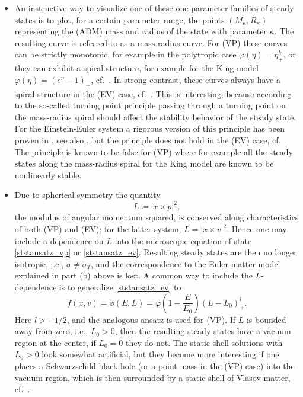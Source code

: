 \documentclass[11pt]{article}
\begin{document}
\begin{remark}
\begin{itemize}
    effect on the stability
    properties of the corresponding steady states, but in the (EV) case steady
    states with sufficiently large $\kappa$ will be seen to be unstable.
  \item[(d)]
    An instructive way to visualize one of these one-parameter families
    of steady states is to plot, for a certain parameter range, the points
    $(M_\kappa,R_\kappa)$ representing the (ADM) mass and radius of the state
    with parameter $\kappa$. The resulting curve is referred to as a
    mass-radius curve. For (VP) these curves can be strictly
    monotonic, for example in the polytropic case
    $\varphi(\eta)=\eta_+^k$, or they
    can exhibit a spiral structure, for example for the King model
    $\varphi(\eta)=(e^\eta-1)_+$, cf.~\cite{RaRe2017}. In strong contrast, these
    curves always have a spiral structure in the (EV) case,
    cf.~\cite{AnRe2,Mak}.
    This is interesting, because according to the so-called turning
    point principle \cite{So1981} passing through a turning point on
    the mass-radius spiral should affect the stability behavior of the
    steady state. For the Einstein-Euler system a rigorous version of
    this principle has been proven in \cite{HaLin}, see also
    \cite{HaLinRe}, but the principle does not hold in the (EV) case,
    cf.~\cite{Gue_e_a,GueStRe21}. The principle is known to be false for
    (VP) where for example all the steady states along the mass-radius
    spiral for the King model are known to be nonlinearly stable.
  \item[(e)]
    Due to spherical symmetry the quantity
    \[
    L\coloneqq |x\times p|^2,
    \]
    the modulus of angular momentum squared, is conserved along
    characteristics of both (VP) and (EV); for the latter system,
    $L=|x\times v|^2$. Hence one may include a
    dependence on $L$ into the microscopic equation of state
    \eqref{ststansatz_vp} or \eqref{ststansatz_ev}.
    Resulting steady states are then no longer isotropic,
    i.e., $\sigma \neq \sigma_T$, and the correspondence to the Euler
    matter model explained in part (b) above is lost. A common way
    to include the $L$-dependence is to generalize \eqref{ststansatz_ev} to
    \begin{equation}\label{ststansatz_evL}
      f(x,v) = \phi(E,L) = \varphi\left(1 -\frac{E}{E_0}\right) (L-L_0)_+^l .
    \end{equation}
    Here $l> -1/2$, and the analogous ansatz is used for (VP).
    If $L$ is bounded away from zero, i.e., $L_0>0$, then the resulting
    steady states have a vacuum region at the center, if $L_0=0$ they do not.
    The static shell solutions with $L_0>0$ look somewhat artificial, but they
    become more interesting if one places a Schwarzschild black hole
    (or a point mass in the (VP) case) into the vacuum region, which is
    then surrounded by a static shell of Vlasov matter,
    cf.~\cite{GueStrRe,Jab,Rein94,Rein99b}.
  \end{itemize}
\end{remark}
%
%
\end{document}
